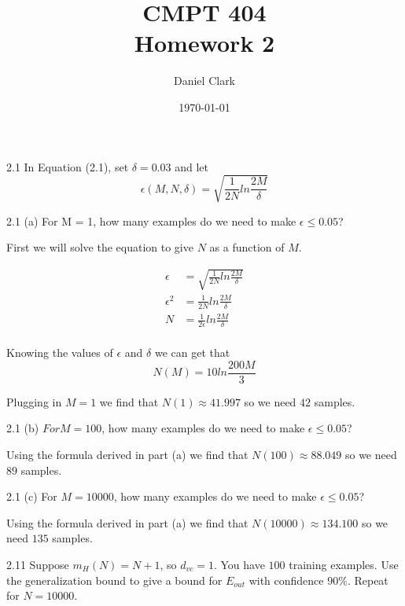 \documentclass[12pt]{article}
\title{CMPT 404\\Homework 2}
\author{Daniel Clark}
\date{\today}
\begin{document}
\maketitle

\begin{description} 
\begin{doublespace}


\item[2.1] In Equation (2.1), set $\delta = 0.03$ and let
\[
    \epsilon(M, N, \delta) = \sqrt{\frac{1}{2N} ln \frac{2M}{\delta}}
\]
\item[2.1 (a)] For M = 1, how many examples do we need to make $\epsilon \leq 0.05$?

    First we will solve the equation to give $N$ as a function of $M$.
    
    \begin{align*}
        \epsilon &= \sqrt{\frac{1}{2N} ln \frac{2M}{\delta}}\\
        \epsilon^2 &= \frac{1}{2N} ln \frac{2M}{\delta}\\
        N &= \frac{1}{2\epsilon} ln \frac{2M}{\delta}\\
    \end{align*}
    
    Knowing the values of $\epsilon$ and $\delta$ we can get that 
\[
    N(M) = 10 ln \frac{200M}{3}
\]

    Plugging in $M = 1$ we find that $N(1) \approx 41.997$ so we need $42$ samples.
    
\item[2.1 (b)] $For M = 100$, how many examples do we need to make $\epsilon \leq 0.05$?

    Using the formula derived in part (a) we find that $N(100) \approx 88.049$ so we need $89$ samples.

\item[2.1 (c)] For $M = 10000$, how many examples do we need to make $\epsilon \leq 0.05$?

    Using the formula derived in part (a) we find that $N(10000) \approx 134.100$ so we need $135$ samples.


\item[2.11] Suppose $m_H(N) = N+1$, so $d_{vc} = 1$. You have $100$ training examples. Use the generalization bound to give a bound for $E_{out}$ with confidence $90\%$. Repeat for $N = 10000$.


\end{doublespace}
\end{description}
\end{document}

